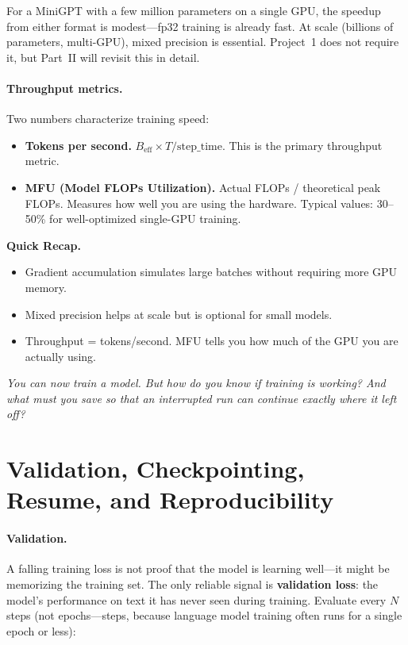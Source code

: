 \noindent For a MiniGPT with a few million parameters on a single GPU, the speedup from either format is modest---fp32 training is already fast. At scale (billions of parameters, multi-GPU), mixed precision is essential. Project~1 does not require it, but Part~II will revisit this in detail.

\paragraph{Throughput metrics.} Two numbers characterize training speed:

\begin{itemize}[nosep]
  \item \textbf{Tokens per second.} $B_{\text{eff}} \times T / \text{step\_time}$. This is the primary throughput metric.
  \item \textbf{MFU (Model FLOPs Utilization).} Actual FLOPs / theoretical peak FLOPs. Measures how well you are using the hardware. Typical values: 30--50\% for well-optimized single-GPU training.
\end{itemize}

\begin{quickrecap}
\textbf{Quick Recap.}
\begin{itemize}[nosep,leftmargin=1.5em]
  \item Gradient accumulation simulates large batches without requiring more GPU memory.
  \item Mixed precision helps at scale but is optional for small models.
  \item Throughput = tokens/second. MFU tells you how much of the GPU you are actually using.
\end{itemize}
\textit{You can now train a model. But how do you know if training is working? And what must you save so that an interrupted run can continue exactly where it left off?}
\end{quickrecap}


\section{Validation, Checkpointing, Resume, and Reproducibility}

\paragraph{Validation.} A falling training loss is not proof that the model is learning well---it might be memorizing the training set. The only reliable signal is \textbf{validation loss}: the model's performance on text it has never seen during training. Evaluate every $N$ steps (not epochs---steps, because language model training often runs for a single epoch or less):

